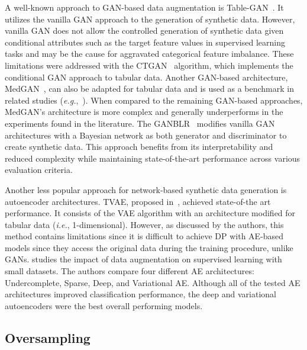 A well-known approach to GAN-based data augmentation is
Table-GAN~\cite{park2018data}. It utilizes the vanilla GAN approach to the
generation of synthetic data. However, vanilla GAN does not allow the
controlled generation of synthetic data given conditional attributes such as
the target feature values in supervised learning tasks and may be the cause
for aggravated categorical feature imbalance. These limitations were addressed
with the CTGAN~\cite{xu2019modeling} algorithm, which implements the
conditional GAN approach to tabular data. Another GAN-based architecture,
MedGAN~\cite{armanious2020medgan}, can also be adapted for tabular data and is
used as a benchmark in related studies (\textit{e.g.},~\cite{xu2019modeling,
zhang2021ganblr}). When compared to the remaining GAN-based approaches,
MedGAN's architecture is more complex and generally underperforms in the
experiments found in the literature. The GANBLR~\cite{zhang2021ganblr}
modifies vanilla GAN architectures with a Bayesian network as both generator
and discriminator to create synthetic data. This approach benefits from its
interpretability and reduced complexity while maintaining state-of-the-art
performance across various evaluation criteria.

Another less popular approach for network-based synthetic data generation
is
autoencoder architectures. TVAE, proposed in~\cite{xu2019modeling}, achieved
state-of-the art performance.  It consists of the VAE algorithm with an
architecture modified for tabular data (\textit{i.e.}, 1-dimensional).
However, as discussed by the authors, this method contains limitations since
it is difficult to achieve DP with AE-based models since they access the
original data during the training procedure, unlike GANs.
\cite{delgado2021deep} studies the impact of data augmentation on supervised
learning with small datasets. The authors compare four different AE
architectures: Undercomplete, Sparse, Deep, and Variational AE\@. Although all
of the tested AE architectures improved classification performance, the deep
and variational autoencoders were the best overall performing models.

\subsection{Oversampling}\label{sec:oversampling}

